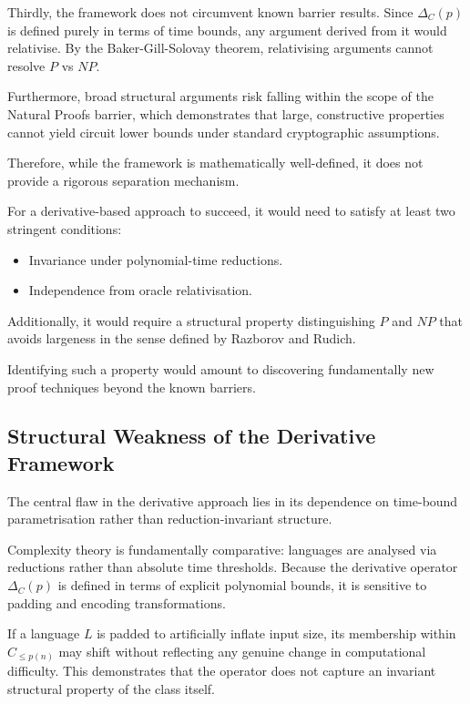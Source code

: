 \documentclass[12pt]{article}
\begin{document}
Thirdly, the framework does not circumvent known barrier results. 
Since $\Delta_C(p)$ is defined purely in terms of time bounds, any argument derived from it would relativise. 
By the Baker-Gill-Solovay theorem, relativising arguments cannot resolve $P$ vs $NP$.

Furthermore, broad structural arguments risk falling within the scope of the Natural Proofs barrier, which demonstrates that large, constructive properties cannot yield circuit lower bounds under standard cryptographic assumptions.

Therefore, while the framework is mathematically well-defined, it does not provide a rigorous separation mechanism.

For a derivative-based approach to succeed, it would need to satisfy at least two stringent conditions:

\begin{itemize}
    \item Invariance under polynomial-time reductions.
    \item Independence from oracle relativisation.
\end{itemize}

Additionally, it would require a structural property distinguishing $P$ and $NP$ that avoids largeness in the sense defined by Razborov and Rudich.

Identifying such a property would amount to discovering fundamentally new proof techniques beyond the known barriers.

\subsection{Structural Weakness of the Derivative Framework}

The central flaw in the derivative approach lies in its dependence on time-bound parametrisation rather than reduction-invariant structure.

Complexity theory is fundamentally comparative: languages are analysed via reductions rather than absolute time thresholds. Because the derivative operator $\Delta_C(p)$ is defined in terms of explicit polynomial bounds, it is sensitive to padding and encoding transformations.

If a language $L$ is padded to artificially inflate input size, its membership within $C_{\leq p(n)}$ may shift without reflecting any genuine change in computational difficulty. This demonstrates that the operator does not capture an invariant structural property of the class itself.
\end{document}
